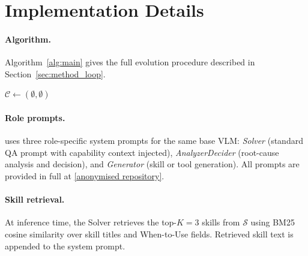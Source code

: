 
\section{Implementation Details}
\label{app:impl}

\paragraph{Algorithm.}
Algorithm~\ref{alg:main} gives the full \sysname{} evolution procedure described in
Section~\ref{sec:method_loop}.

\begin{algorithm}[h]
\SetAlgoLined
{}
$\mathcal{C} \leftarrow (\emptyset, \emptyset)$\;
\;
\caption{\sysname{} evolution loop.}
\label{alg:main}
\end{algorithm}

\paragraph{Role prompts.}
\sysname{} uses three role-specific system prompts for the same base VLM:
\textit{Solver} (standard QA prompt with capability context injected),
\textit{AnalyzerDecider} (root-cause analysis and decision), and
\textit{Generator} (skill or tool generation).
All prompts are provided in full at \url{[anonymised repository]}.

\paragraph{Skill retrieval.}
At inference time, the Solver retrieves the top-$K{=}3$ skills from $\mathcal{S}$ using BM25
cosine similarity over skill titles and When-to-Use fields.
Retrieved skill text is appended to the system prompt.

